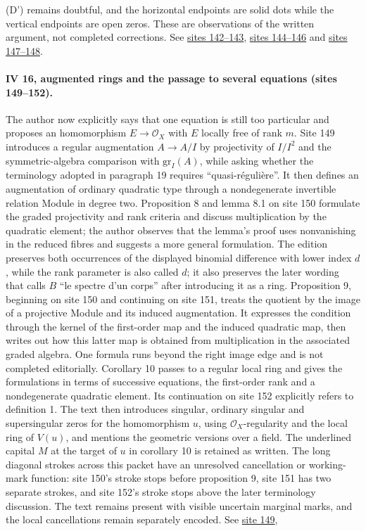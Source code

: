 (D') remains doubtful, and the horizontal endpoints are solid dots while the vertical endpoints are open zeros. These are observations of the written argument, not completed corrections. See \href{https://grothendieck.umontpellier.fr/web/viewer.html?file=../25.pdf#page=143}{sites 142--143}, \href{https://grothendieck.umontpellier.fr/web/viewer.html?file=../25.pdf#page=145}{sites 144--146} and \href{https://grothendieck.umontpellier.fr/web/viewer.html?file=../25.pdf#page=148}{sites 147--148}.

\paragraph{IV 16, augmented rings and the passage to several equations (sites 149--152).}
The author now explicitly says that one equation is still too particular and proposes an homomorphism $E\longrightarrow\mathcal O_X$ with $E$ locally free of rank $m$. Site 149 introduces a regular augmentation $A\longrightarrow A/I$ by projectivity of $I/I^2$ and the symmetric-algebra comparison with $\mathrm{gr}_I(A)$, while asking whether the terminology adopted in paragraph 19 requires ``quasi-régulière''. It then defines an augmentation of ordinary quadratic type through a nondegenerate invertible relation Module in degree two. Proposition 8 and lemma 8.1 on site 150 formulate the graded projectivity and rank criteria and discuss multiplication by the quadratic element; the author observes that the lemma's proof uses nonvanishing in the reduced fibres and suggests a more general formulation. The edition preserves both occurrences of the displayed binomial difference with lower index $d$, while the rank parameter is also called $d$; it also preserves the later wording that calls $B$ ``le spectre d'un corps'' after introducing it as a ring. Proposition 9, beginning on site 150 and continuing on site 151, treats the quotient by the image of a projective Module and its induced augmentation. It expresses the condition through the kernel of the first-order map and the induced quadratic map, then writes out how this latter map is obtained from multiplication in the associated graded algebra. One formula runs beyond the right image edge and is not completed editorially. Corollary 10 passes to a regular local ring and gives the formulations in terms of successive equations, the first-order rank and a nondegenerate quadratic element. Its continuation on site 152 explicitly refers to definition 1. The text then introduces singular, ordinary singular and supersingular zeros for the homomorphism $u$, using $\mathcal O_X$-regularity and the local ring of $V(u)$, and mentions the geometric versions over a field. The underlined capital $M$ at the target of $u$ in corollary 10 is retained as written. The long diagonal strokes across this packet have an unresolved cancellation or working-mark function: site 150's stroke stops before proposition 9, site 151 has two separate strokes, and site 152's stroke stops above the later terminology discussion. The text remains present with visible uncertain marginal marks, and the local cancellations remain separately encoded. See \href{https://grothendieck.umontpellier.fr/web/viewer.html?file=../25.pdf#page=150}{site 149}, 